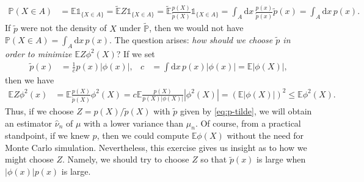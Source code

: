 \documentclass[12pt]{book}
\let\varphi\phi
\numberwithin{equation}{chapter}
\theoremstyle{plain}
\numberwithin{theorem}{section}
\theoremstyle{definition}
\numberwithin{exercise}{chapter}
\newcommand{\<}{\langle}
\renewcommand{\>}{\rangle}
\renewcommand{\(}{\left(}
\renewcommand{\)}{\right)}
\renewcommand{\[}{\left[}
\renewcommand{\]}{\right]}
\newcommand\Eb{\mathds{E}}
\newcommand\Ib{\mathds{1}} 	%
\newcommand\Pb{\mathds{P}}
\newcommand\nuh{\widehat{\nu}}
\newcommand\muh{\widehat{\mu}}
\newcommand\Ebt{\widetilde{\Eb}}
\newcommand\Pbt{\widetilde{\Pb}}
\newcommand\pt{\widetilde{p}}
\newcommand\dd{\mathrm{d}}
\begin{document}
\begin{align}
\Pb(X \in A)
	&= \Eb \Ib_{\{X \in A\}}
	=		\Ebt Z \Ib_{\{X \in A\}}
	=		\Ebt \frac{p(X)}{\pt(X)} \Ib_{\{X \in A\}} 
	=		\int_A \dd x \, \frac{p(x)}{\pt(x)} \pt(x)
	=		\int_A \dd x \, p(x) .
\end{align}
If $\pt$ were not the density of $X$ under $\Pbt$, then we would not have $\Pb(X \in A) = \int_A \dd x \, p(x)$.
The question arises: \emph{how should we choose $\pt$ in order to minimize $\Eb Z \varphi^2(X)$}?  
If we set
\begin{align}
\pt(x)
	&=	\frac{1}{c} p(x) |\varphi(x)| , &
c
	&=	\int \dd x \, p(x) |\varphi(x)| = \Eb |\varphi(X)|, \label{eq:p-tilde}
\end{align}
then we have
\begin{align}
\Eb Z \varphi^2(x)
	&=	\Eb \frac{p(X)}{\pt(X)} \varphi^2(X) 
	=		c \Eb  \frac{p(X)}{p(X) |\varphi(X)|} |\varphi^2(X) |
	=	( \Eb |\varphi(X)| )^2 
	\leq \Eb \varphi^2(X) .
\end{align}
Thus, if we choose $Z = p(X)/\pt(X)$ with $\pt$ given by \eqref{eq:p-tilde}, we will obtain an estimator $\nuh_n$ of $\mu$ with a lower variance than $\muh_n$.  Of course, from a practical standpoint, if we knew $p$, then we could compute $\Eb \varphi(X)$ without the need for Monte Carlo simulation.  Nevertheless, this exercise gives us insight as to how we might choose $Z$.  Namely, we should try to choose $Z$ so that $\pt(x)$ is large when $|\varphi(x)| p(x)$ is large.
\end{document}
